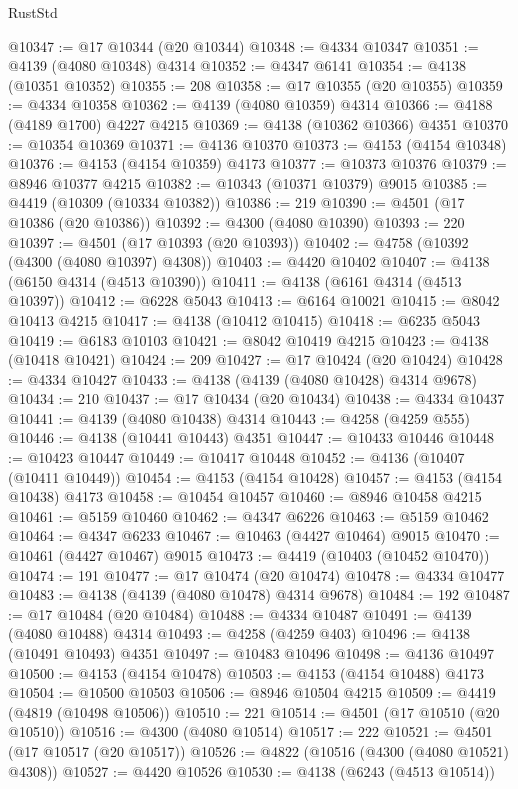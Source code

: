 \begin{lexlean}{RustStd}
\begin{coremodule}
@10347 := @17 @10344 (@20 @10344)
@10348 := @4334 @10347
@10351 := @4139 (@4080 @10348) @4314
@10352 := @4347 @6141
@10354 := @4138 (@10351 @10352)
@10355 := 208
@10358 := @17 @10355 (@20 @10355)
@10359 := @4334 @10358
@10362 := @4139 (@4080 @10359) @4314
@10366 := @4188 (@4189 @1700) @4227 @4215
@10369 := @4138 (@10362 @10366) @4351
@10370 := @10354 @10369
@10371 := @4136 @10370
@10373 := @4153 (@4154 @10348)
@10376 := @4153 (@4154 @10359) @4173
@10377 := @10373 @10376
@10379 := @8946 @10377 @4215
@10382 := @10343 (@10371 @10379) @9015
@10385 := @4419 (@10309 (@10334 @10382))
@10386 := 219
@10390 := @4501 (@17 @10386 (@20 @10386))
@10392 := @4300 (@4080 @10390)
@10393 := 220
@10397 := @4501 (@17 @10393 (@20 @10393))
@10402 := @4758 (@10392 (@4300 (@4080 @10397) @4308))
@10403 := @4420 @10402
@10407 := @4138 (@6150 @4314 (@4513 @10390))
@10411 := @4138 (@6161 @4314 (@4513 @10397))
@10412 := @6228 @5043
@10413 := @6164 @10021
@10415 := @8042 @10413 @4215
@10417 := @4138 (@10412 @10415)
@10418 := @6235 @5043
@10419 := @6183 @10103
@10421 := @8042 @10419 @4215
@10423 := @4138 (@10418 @10421)
@10424 := 209
@10427 := @17 @10424 (@20 @10424)
@10428 := @4334 @10427
@10433 := @4138 (@4139 (@4080 @10428) @4314 @9678)
@10434 := 210
@10437 := @17 @10434 (@20 @10434)
@10438 := @4334 @10437
@10441 := @4139 (@4080 @10438) @4314
@10443 := @4258 (@4259 @555)
@10446 := @4138 (@10441 @10443) @4351
@10447 := @10433 @10446
@10448 := @10423 @10447
@10449 := @10417 @10448
@10452 := @4136 (@10407 (@10411 @10449))
@10454 := @4153 (@4154 @10428)
@10457 := @4153 (@4154 @10438) @4173
@10458 := @10454 @10457
@10460 := @8946 @10458 @4215
@10461 := @5159 @10460
@10462 := @4347 @6226
@10463 := @5159 @10462
@10464 := @4347 @6233
@10467 := @10463 (@4427 @10464) @9015
@10470 := @10461 (@4427 @10467) @9015
@10473 := @4419 (@10403 (@10452 @10470))
@10474 := 191
@10477 := @17 @10474 (@20 @10474)
@10478 := @4334 @10477
@10483 := @4138 (@4139 (@4080 @10478) @4314 @9678)
@10484 := 192
@10487 := @17 @10484 (@20 @10484)
@10488 := @4334 @10487
@10491 := @4139 (@4080 @10488) @4314
@10493 := @4258 (@4259 @403)
@10496 := @4138 (@10491 @10493) @4351
@10497 := @10483 @10496
@10498 := @4136 @10497
@10500 := @4153 (@4154 @10478)
@10503 := @4153 (@4154 @10488) @4173
@10504 := @10500 @10503
@10506 := @8946 @10504 @4215
@10509 := @4419 (@4819 (@10498 @10506))
@10510 := 221
@10514 := @4501 (@17 @10510 (@20 @10510))
@10516 := @4300 (@4080 @10514)
@10517 := 222
@10521 := @4501 (@17 @10517 (@20 @10517))
@10526 := @4822 (@10516 (@4300 (@4080 @10521) @4308))
@10527 := @4420 @10526
@10530 := @4138 (@6243 (@4513 @10514))

\end{coremodule}
\end{lexlean}

